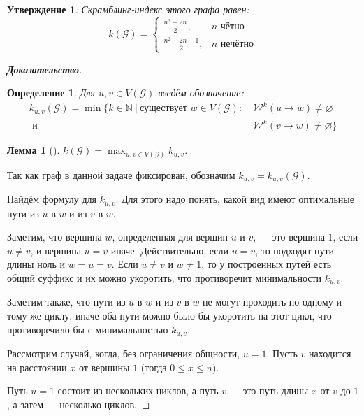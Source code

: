 \documentclass[12pt]{article}
\newtheorem{definition}[theorem]{Определение}
\newtheorem{proposition}[theorem]{Утверждение}
\newtheorem{lemma}[theorem]{Лемма}
\begin{document}
\begin{proposition}
Скрамблинг-индекс этого графа равен: \begin{equation*}
k(\mathcal{G}) = \begin{cases}
        \frac{n^2 + 2n}{2},     & n \text{ чётно} \\
        \frac{n^2 + 2n - 1}{2}, & n \text{ нечётно}
    \end{cases}
\end{equation*}
\end{proposition}
\begin{proof}[\textbf{Доказательство}]
\begin{definition}
Для $u, v \in V(\mathcal{G})$ введём обозначение:\begin{align*}
k_{u,v}(\mathcal{G}) = \min \{ k \in \mathbb{N} \ | \ \text{существует } w \in V(\mathcal{G}) :\  &\mathcal{W}^k(u \rightarrow w) \neq \varnothing \\
\text{ и } &\mathcal{W}^k(v \rightarrow w) \neq \varnothing\}
\end{align*}
\end{definition}
\begin{lemma}[\cite{scramblingIndex}]
\label{k_uvLemma}
$k(\mathcal{G}) = \max_{u, v \in V(\mathcal{G})} k_{u,v}$.
\end{lemma}

Так как граф в данной задаче фиксирован, обозначим $k_{u,v} = k_{u,v}(\mathcal{G})$.

Найдём формулу для $k_{u,v}$. Для этого надо понять, какой вид имеют оптимальные пути из $u$ в $w$ и из $v$ в $w$.

Заметим, что вершина $w$, определенная для вершин $u$ и $v$, --- это вершина $1$, если $u \neq v$, и вершина $u = v$ иначе. Действительно, если $u = v$, то подходят пути длины ноль и $w = u = v$. Если $u \neq v$ и $w \neq 1$, то у построенных путей есть общий суффикс и их можно укоротить, что противоречит минимальности $k_{u,v}$.

Заметим также, что пути из $u$ в $w$ и из $v$ в $w$ не могут проходить по одному и тому же циклу, иначе оба пути можно было бы укоротить на этот цикл, что противоречило бы с минимальностью $k_{u, v}$.

Рассмотрим случай, когда, без ограничения общности, $u = 1$. Пусть $v$ находится на расстоянии $x$ от вершины $1$ (тогда $0 \le x \le n$).

Путь $u = 1$ состоит из нескольких циклов, а путь $v$ --- это путь длины $x$ от $v$ до $1$, а затем --- несколько циклов.


\end{proof}
\end{document}
